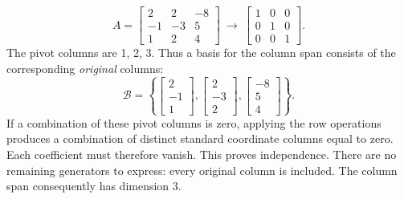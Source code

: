 \[A=\left[\begin{array}{rrr}2&2&-8\\-1&-3&5\\1&2&4\end{array}\right]\ \longrightarrow\ \left[\begin{array}{rrr}1&0&0\\0&1&0\\0&0&1\end{array}\right].\]
The pivot columns are 1, 2, 3. Thus a basis for the column span consists of the corresponding \emph{original} columns:
\[\mathcal B=\left\{\left[\begin{array}{r}2\\-1\\1\end{array}\right],\left[\begin{array}{r}2\\-3\\2\end{array}\right],\left[\begin{array}{r}-8\\5\\4\end{array}\right]\right\}.\]
If a combination of these pivot columns is zero, applying the row operations produces a combination of distinct standard coordinate columns equal to zero. Each coefficient must therefore vanish. This proves independence. There are no remaining generators to express: every original column is included. The column span consequently has dimension $3$.

